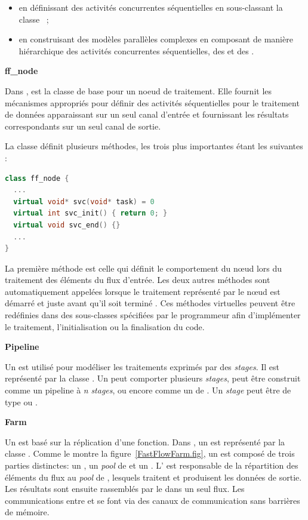 \begin{itemize}
\item en d\'efinissant des activit\'es concurrentes s\'equentielles en sous-classant la classe ~;
 
\item en construisant des mod\`eles parall\`eles complexes en composant de mani\`ere hi\'erarchique des activit\'es concurrentes s\'equentielles, des  et des .
\end{itemize}

\textbf{ff\_node}

Dans ,  est la classe de base pour un noeud de traitement. Elle fournit les m\'ecanismes appropri\'es pour d\'efinir des activit\'es s\'equentielles pour le traitement de données apparaissant sur un seul canal d'entr\'ee et fournissant les r\'esultats correspondants sur un seul canal de sortie. 

La classe  d\'efinit plusieurs m\'ethodes, les trois plus importantes \'etant les suivantes :
\begin{lstlisting}[language=c++]
class ff_node {
  ...
  virtual void* svc(void* task) = 0
  virtual int svc_init() { return 0; } 
  virtual void svc_end() {} 
  ...
}
\end{lstlisting}

La premi\`ere m\'ethode est celle qui d\'efinit le comportement du nœud lors du traitement des \'el\'ements du flux d'entr\'ee. Les deux autres m\'ethodes sont automatiquement appel\'ees lorsque le traitement repr\'esent\'e par le nœud est d\'emarr\'e  et juste avant qu'il soit termin\'e . Ces m\'ethodes virtuelles peuvent \^etre red\'efinies dans des sous-classes  sp\'ecifi\'ees par le programmeur afin d'impl\'ementer le traitement, l'initialisation ou la finalisation du code.


\textbf{Pipeline}

Un  est utilis\'e pour mod\'eliser les traitements exprim\'es par des \emph{stages}. Il est repr\'esent\'e par la classe . Un  peut comporter plusieurs \emph{stages}, peut \^etre construit comme un pipeline \`a \emph{n} \emph{stages}, ou encore comme un  de . Un \emph{stage} peut \^etre de type  ou .


\goodbreak

\textbf{Farm}

Un  est bas\'e sur la r\'eplication d'une fonction. Dans , un  est repr\'esent\'e par la classe . Comme le montre la figure~\ref{FastFlowFarm.fig}, un  est compos\'e de trois parties distinctes: un , un  \emph{pool} de  et un . L' est responsable de la r\'epartition des \'el\'ements du flux au \emph{pool} de , lesquels traitent et produisent les donn\'ees de sortie. Les r\'esultats sont ensuite rassembl\'es par le  dans un seul flux. Les communications entre  et  se font via des canaux de communication sans barri\`eres de m\'emoire.

